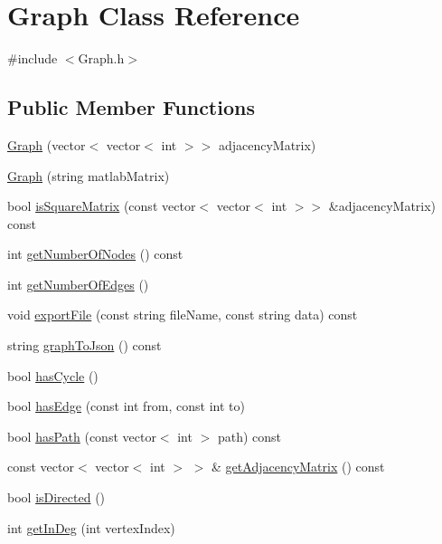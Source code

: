 \hypertarget{class_graph}{\section{Graph Class Reference}
\label{class_graph}
}


{\ttfamily \#include $<$Graph.\-h$>$}

\subsection*{Public Member Functions}
\begin{DoxyCompactItemize}
\item 
\hyperlink{class_graph_a173fa6ec1022bc0f793e3debfd19ad2c}{Graph} (vector$<$ vector$<$ int $>$$>$ adjacency\-Matrix)
\item 
\hyperlink{class_graph_afa40c944594ef9360902cfa3a754d4ef}{Graph} (string matlab\-Matrix)
\item 
bool \hyperlink{class_graph_a00f613f4d274a895e08988074a3a9e9a}{is\-Square\-Matrix} (const vector$<$ vector$<$ int $>$$>$ \&adjacency\-Matrix) const 
\item 
int \hyperlink{class_graph_a217051ac8e8d46ca74e7837f16fbed96}{get\-Number\-Of\-Nodes} () const 
\item 
int \hyperlink{class_graph_ab532b8f903f75621e6ca3469e8dbe0bf}{get\-Number\-Of\-Edges} ()
\item 
void \hyperlink{class_graph_ac38ffcb580b1a9fa57142812aac33c46}{export\-File} (const string file\-Name, const string data) const 
\item 
string \hyperlink{class_graph_a027c9787cdf583c5e6d1cc048c3a7c32}{graph\-To\-Json} () const 
\item 
bool \hyperlink{class_graph_a6fcbfa381804b43a67d92eed7f30e1d9}{has\-Cycle} ()
\item 
bool \hyperlink{class_graph_a0a4f1d268e549a905d0451cfdfc6f2db}{has\-Edge} (const int from, const int to)
\item 
bool \hyperlink{class_graph_abc5691276d7bab874ae07a40173d50ec}{has\-Path} (const vector$<$ int $>$ path) const 
\item 
const vector$<$ vector$<$ int $>$ $>$ \& \hyperlink{class_graph_a74d5b2bcc4df084d9c4651d3cb2abf1e}{get\-Adjacency\-Matrix} () const 
\item 
bool \hyperlink{class_graph_afd552af25f5c9672848693d66f27827a}{is\-Directed} ()
\item 
int \hyperlink{class_graph_aa22848281e37e921bf4fc998bcf66295}{get\-In\-Deg} (int vertex\-Index)

\end{DoxyCompactItemize}
